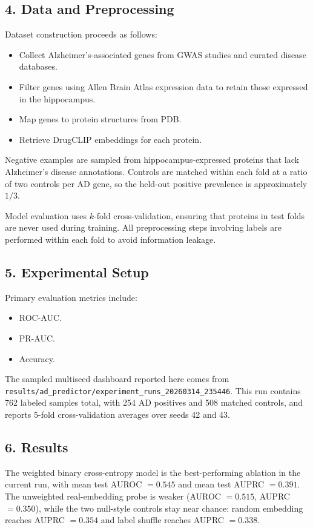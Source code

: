 \documentclass{article}
\begin{document}
\subsection*{4. Data and Preprocessing}
Dataset construction proceeds as follows:
\begin{itemize}
    \item Collect Alzheimer's-associated genes from GWAS studies \cite{disgenet2023,lambert2013} and curated disease databases.
    \item Filter genes using Allen Brain Atlas expression data to retain those expressed in the hippocampus.
    \item Map genes to protein structures from PDB.
    \item Retrieve DrugCLIP embeddings for each protein.
\end{itemize}

Negative examples are sampled from hippocampus-expressed proteins that lack Alzheimer's disease annotations. Controls are matched within each fold at a ratio of two controls per AD gene, so the held-out positive prevalence is approximately $1/3$.

Model evaluation uses $k$-fold cross-validation, ensuring that proteins in test folds are never used during training. All preprocessing steps involving labels are performed within each fold to avoid information leakage.

\subsection*{5. Experimental Setup}
Primary evaluation metrics include:
\begin{itemize}
    \item ROC-AUC.
    \item PR-AUC.
    \item Accuracy.
\end{itemize}

The sampled multiseed dashboard reported here comes from \texttt{results/ad\_predictor/experiment\_runs\_20260314\_235446}. This run contains 762 labeled samples total, with 254 AD positives and 508 matched controls, and reports 5-fold cross-validation averages over seeds 42 and 43.

\subsection*{6. Results}
The weighted binary cross-entropy model is the best-performing ablation in the current run, with mean test AUROC $= 0.545$ and mean test AUPRC $= 0.391$. The unweighted real-embedding probe is weaker (AUROC $= 0.515$, AUPRC $= 0.350$), while the two null-style controls stay near chance: random embedding reaches AUPRC $= 0.354$ and label shuffle reaches AUPRC $= 0.338$.
\end{document}
